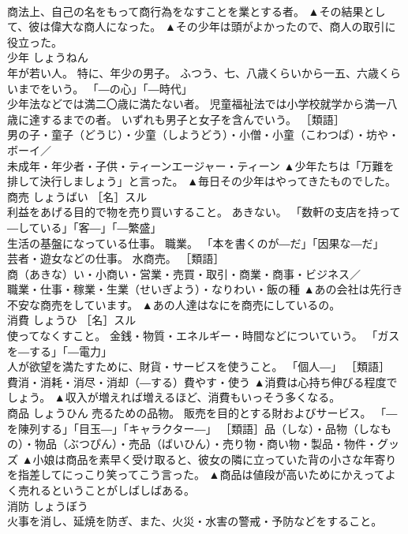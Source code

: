 \documentclass[8pt]{extreport}
\begin{document}
\begin{CJK}{UTF8}{min}
\\	商法上、自己の名をもって商行為をなすことを業とする者。	▲その結果として、彼は偉大な商人になった。 ▲その少年は頭がよかったので、商人の取引に役立った。
\\	少年	しょうねん	
\\	年が若い人。 特に、年少の男子。 ふつう、七、八歳くらいから一五、六歳くらいまでをいう。 「―の心」「―時代」 
\\	少年法などでは満二〇歳に満たない者。 児童福祉法では小学校就学から満一八歳に達するまでの者。 いずれも男子と女子を含んでいう。 ［類語］
\\	男の子・童子（どうじ）・少童（しようどう）・小僧・小童（こわつぱ）・坊や・ボーイ／
\\	未成年・年少者・子供・ティーンエージャー・ティーン	▲少年たちは「万難を排して決行しましょう」と言った。 ▲毎日その少年はやってきたものでした。
\\	商売	しょうばい	［名］スル 
\\	利益をあげる目的で物を売り買いすること。 あきない。 「数軒の支店を持って―している」「客―」「―繁盛」 
\\	生活の基盤になっている仕事。 職業。 「本を書くのが―だ」「因果な―だ」 
\\	芸者・遊女などの仕事。 水商売。 ［類語］
\\	商（あきな）い・小商い・営業・売買・取引・商業・商事・ビジネス／
\\	職業・仕事・稼業・生業（せいぎよう）・なりわい・飯の種	▲あの会社は先行き不安な商売をしています。 ▲あの人達はなにを商売にしているの。
\\	消費	しょうひ	［名］スル 
\\	使ってなくすこと。 金銭・物質・エネルギー・時間などについていう。 「ガスを―する」「―電力」 
\\	人が欲望を満たすために、財貨・サービスを使うこと。 「個人―」 ［類語］
\\	費消・消耗・消尽・消却（―する）費やす・使う	▲消費は心持ち伸びる程度でしょう。 ▲収入が増えれば増えるほど、消費もいっそう多くなる。
\\	商品	しょうひん	売るための品物。 販売を目的とする財およびサービス。 「―を陳列する」「目玉―」「キャラクター―」 ［類語］品（しな）・品物（しなもの）・物品（ぶつぴん）・売品（ばいひん）・売り物・商い物・製品・物件・グッズ	▲小娘は商品を素早く受け取ると、彼女の隣に立っていた背の小さな年寄りを指差してにっこり笑ってこう言った。 ▲商品は値段が高いためにかえってよく売れるということがしばしばある。
\\	消防	しょうぼう	
\\	火事を消し、延焼を防ぎ、また、火災・水害の警戒・予防などをすること。 

\end{CJK}
\end{document}
